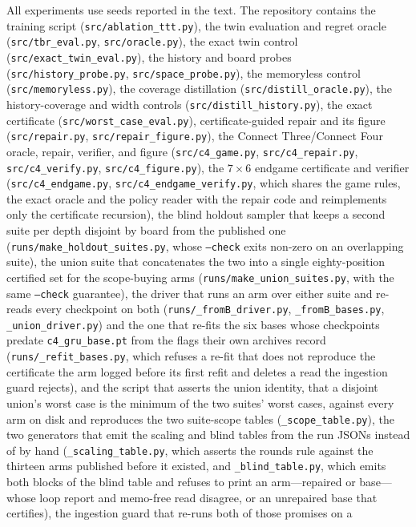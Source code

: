 \documentclass[conference]{IEEEtran}
\begin{document}
All experiments use seeds reported in the text. The repository contains the training script (\texttt{src/ablation\_ttt.py}), the twin evaluation and regret oracle (\texttt{src/tbr\_eval.py}, \texttt{src/oracle.py}), the exact twin control (\texttt{src/exact\_twin\_eval.py}), the history and board probes (\texttt{src/history\_probe.py}, \texttt{src/space\_probe.py}), the memoryless control (\texttt{src/memoryless.py}), the coverage distillation (\texttt{src/distill\_oracle.py}), the history-coverage and width controls (\texttt{src/distill\_history.py}), the exact certificate (\texttt{src/worst\_case\_eval.py}), certificate-guided repair and its figure (\texttt{src/repair.py}, \texttt{src/repair\_figure.py}), the Connect Three/Connect Four oracle, repair, verifier, and figure (\texttt{src/c4\_game.py}, \texttt{src/c4\_repair.py}, \texttt{src/c4\_verify.py}, \texttt{src/c4\_figure.py}), the $7\times6$ endgame certificate and verifier (\texttt{src/c4\_endgame.py}, \texttt{src/c4\_endgame\_verify.py}, which shares the game rules, the exact oracle and the policy reader with the repair code and reimplements only the certificate recursion), the blind holdout sampler that keeps a second suite per depth disjoint by board from the published one (\texttt{runs/make\_holdout\_suites.py}, whose \texttt{--check} exits non-zero on an overlapping suite), the union suite that concatenates the two into a single eighty-position certified set for the scope-buying arms (\texttt{runs/make\_union\_suites.py}, with the same \texttt{--check} guarantee), the driver that runs an arm over either suite and re-reads every checkpoint on both (\texttt{runs/\_fromB\_driver.py}, \texttt{\_fromB\_bases.py}, \texttt{\_union\_driver.py}) and the one that re-fits the six bases whose checkpoints predate \texttt{c4\_gru\_base.pt} from the flags their own archives record (\texttt{runs/\_refit\_bases.py}, which refuses a re-fit that does not reproduce the certificate the arm logged before its first refit and deletes a read the ingestion guard rejects), and the script that asserts the union identity, that a disjoint union's worst case is the minimum of the two suites' worst cases, against every arm on disk and reproduces the two suite-scope tables (\texttt{\_scope\_table.py}), the two generators that emit the scaling and blind tables from the run JSONs instead of by hand (\texttt{\_scaling\_table.py}, which asserts the rounds rule against the thirteen arms published before it existed, and \texttt{\_blind\_table.py}, which emits both blocks of the blind table and refuses to print an arm---repaired or base---whose loop report and memo-free read disagree, or an unrepaired base that certifies), the ingestion guard that re-runs both of those promises on a
\end{document}
